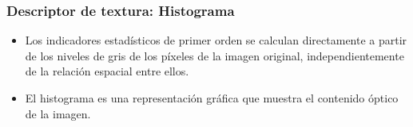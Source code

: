 \documentclass[
10pt, %
aspectratio=169, %
]{beamer}
\begin{document}
	\begin{frame}
		
		\frametitle{Descriptor de textura: Histograma}
		
		\begin{itemize}
			\item Los indicadores estadísticos de primer orden se calculan directamente a partir de los niveles de gris de los píxeles de la imagen original, independientemente de la relación espacial entre ellos. 
			
			\item El histograma es una representación gráfica que muestra el contenido óptico de la imagen.
			
		\end{itemize}
		
		\pause
		\vspace{2\baselineskip}
		

\end{frame}
\end{document}
